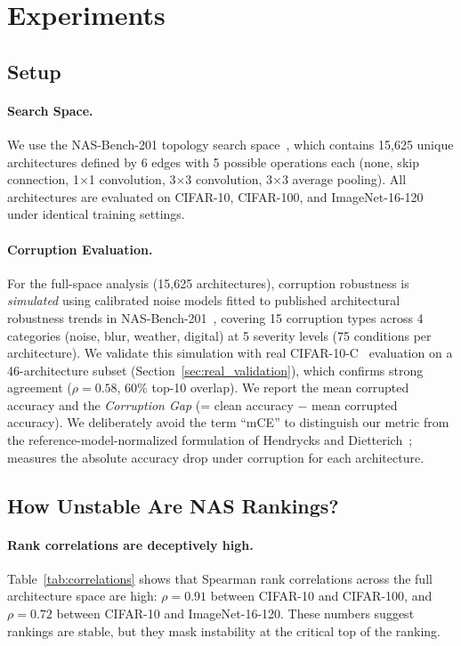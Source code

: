 \section{Experiments}
\label{sec:experiments}

\subsection{Setup}

\paragraph{Search Space.}
We use the NAS-Bench-201 topology search space~\cite{dong2020nasbench201}, which contains 15,625 unique architectures defined by 6 edges with 5 possible operations each (none, skip connection, 1$\times$1 convolution, 3$\times$3 convolution, 3$\times$3 average pooling).
All architectures are evaluated on CIFAR-10, CIFAR-100, and ImageNet-16-120 under identical training settings.

\paragraph{Corruption Evaluation.}
For the full-space analysis (15,625 architectures), corruption robustness is \emph{simulated} using calibrated noise models fitted to published architectural robustness trends in NAS-Bench-201~\cite{guo2020robnet}, covering 15 corruption types across 4 categories (noise, blur, weather, digital) at 5 severity levels (75 conditions per architecture).
We validate this simulation with real CIFAR-10-C~\cite{hendrycks2019benchmarking} evaluation on a 46-architecture subset (Section~\ref{sec:real_validation}), which confirms strong agreement ($\rho = 0.58$, 60\% top-10 overlap).
We report the mean corrupted accuracy and the \emph{Corruption Gap} (\cg = clean accuracy $-$ mean corrupted accuracy).
We deliberately avoid the term ``mCE'' to distinguish our metric from the reference-model-normalized formulation of Hendrycks and Dietterich~\cite{hendrycks2019benchmarking}; \cg measures the absolute accuracy drop under corruption for each architecture.

\subsection{How Unstable Are NAS Rankings?}
\label{sec:rank_instability}

\paragraph{Rank correlations are deceptively high.}
Table~\ref{tab:correlations} shows that Spearman rank correlations across the full architecture space are high: $\rho = 0.91$ between CIFAR-10 and CIFAR-100, and $\rho = 0.72$ between CIFAR-10 and ImageNet-16-120.
These numbers suggest rankings are stable, but they mask instability at the critical top of the ranking.

